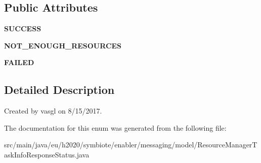 \subsection*{Public Attributes}
\begin{DoxyCompactItemize}
\item 
\mbox{\label{enumeu_1_1h2020_1_1symbiote_1_1enabler_1_1messaging_1_1model_1_1ResourceManagerTaskInfoResponseStatus_a725f1d10b4629d079316ce4500a2098e}} 
{\bfseries S\+U\+C\+C\+E\+SS}
\item 
\mbox{\label{enumeu_1_1h2020_1_1symbiote_1_1enabler_1_1messaging_1_1model_1_1ResourceManagerTaskInfoResponseStatus_a37ac12b309d42f1af78b392b00c0d54c}} 
{\bfseries N\+O\+T\+\_\+\+E\+N\+O\+U\+G\+H\+\_\+\+R\+E\+S\+O\+U\+R\+C\+ES}
\item 
\mbox{\label{enumeu_1_1h2020_1_1symbiote_1_1enabler_1_1messaging_1_1model_1_1ResourceManagerTaskInfoResponseStatus_a2bb29fe49de7b91bdb55a8f9a9996e87}} 
{\bfseries F\+A\+I\+L\+ED}
\end{DoxyCompactItemize}


\subsection{Detailed Description}
Created by vasgl on 8/15/2017. 

The documentation for this enum was generated from the following file\+:\begin{DoxyCompactItemize}
\item 
src/main/java/eu/h2020/symbiote/enabler/messaging/model/Resource\+Manager\+Task\+Info\+Response\+Status.\+java\end{DoxyCompactItemize}

